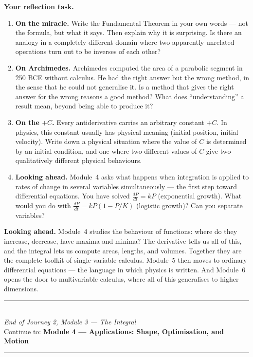 \documentclass[12pt, a4paper]{article}
\begin{document}
\begin{reflectionbox}
\textbf{Your reflection task.}

\begin{enumerate}
  \item \textbf{On the miracle.} Write the Fundamental Theorem in your own words --- not the formula, but what it says. Then explain why it is surprising. Is there an analogy in a completely different domain where two apparently unrelated operations turn out to be inverses of each other?

  \item \textbf{On Archimedes.} Archimedes computed the area of a parabolic segment in 250 BCE without calculus. He had the right answer but the wrong method, in the sense that he could not generalise it. Is a method that gives the right answer for the wrong reasons a good method? What does ``understanding'' a result mean, beyond being able to produce it?

  \item \textbf{On the $+C$.} Every antiderivative carries an arbitrary constant $+C$. In physics, this constant usually has physical meaning (initial position, initial velocity). Write down a physical situation where the value of $C$ is determined by an initial condition, and one where two different values of $C$ give two qualitatively different physical behaviours.

  \item \textbf{Looking ahead.} Module~4 asks what happens when integration is applied to rates of change in several variables simultaneously --- the first step toward differential equations. You have solved $\frac{dP}{dt} = kP$ (exponential growth). What would you do with $\frac{dP}{dt} = kP(1-P/K)$ (logistic growth)? Can you separate variables?
\end{enumerate}
\end{reflectionbox}

\medskip
\noindent\textbf{Looking ahead.}
Module~4 studies the behaviour of functions: where do they increase, decrease, have maxima and minima? The derivative tells us all of this, and the integral lets us compute areas, lengths, and volumes. Together they are the complete toolkit of single-variable calculus. Module~5 then moves to ordinary differential equations --- the language in which physics is written. And Module~6 opens the door to multivariable calculus, where all of this generalises to higher dimensions.

\vspace{1.4cm}
\begin{center}
{\color{MidBlue}\rule{0.5\linewidth}{0.8pt}}\\[6pt]
{\small\color{DarkGrey}\textit{End of Journey 2, Module 3 --- The Integral}}\\[4pt]
{\small\color{DarkGrey}Continue to: \textbf{Module 4 --- Applications: Shape, Optimisation, and Motion}}\\[6pt]
{\color{MidBlue}\rule{0.5\linewidth}{0.8pt}}
\end{center}
\end{document}
